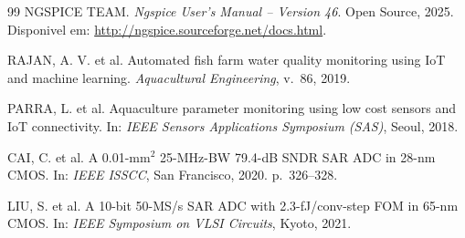 \documentclass[12pt, a4paper]{article}
\begin{document}
\begin{thebibliography}{99}
NGSPICE TEAM.
\textit{Ngspice User's Manual -- Version 46}. Open Source, 2025.
Disponivel em: \url{http://ngspice.sourceforge.net/docs.html}.

RAJAN, A. V. et al.
Automated fish farm water quality monitoring using IoT and machine learning.
\textit{Aquacultural Engineering}, v.~86, 2019.

PARRA, L. et al.
Aquaculture parameter monitoring using low cost sensors and IoT connectivity.
In: \textit{IEEE Sensors Applications Symposium (SAS)}, Seoul, 2018.

CAI, C. et al.
A 0.01-mm$^2$ 25-MHz-BW 79.4-dB SNDR SAR ADC in 28-nm CMOS.
In: \textit{IEEE ISSCC}, San Francisco, 2020. p.~326--328.

LIU, S. et al.
A 10-bit 50-MS/s SAR ADC with 2.3-fJ/conv-step FOM in 65-nm CMOS.
In: \textit{IEEE Symposium on VLSI Circuits}, Kyoto, 2021.

\end{thebibliography}
\end{document}
